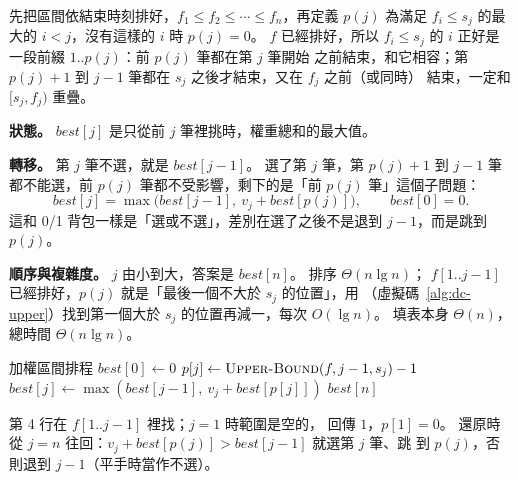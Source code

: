 先把區間依結束時刻排好，$f_1 \le f_2 \le \cdots \le f_n$，再定義 $p(j)$ 為滿足 $f_i \le s_j$
的最大的 $i < j$，沒有這樣的 $i$ 時 $p(j) = 0$。 $f$ 已經排好，所以 $f_i \le s_j$ 的 $i$ 正好是一段前綴 $1..p(j)$：前 $p(j)$ 筆都在第 $j$ 筆開始
之前結束，和它相容；第 $p(j) + 1$ 到 $j - 1$ 筆都在 $s_j$ 之後才結束，又在 $f_j$ 之前（或同時）
結束，一定和 $[s_j, f_j)$ 重疊。

\textbf{狀態。} $\mathit{best}[j]$ 是只從前 $j$ 筆裡挑時，權重總和的最大值。

\textbf{轉移。} 第 $j$ 筆不選，就是 $\mathit{best}[j - 1]$。 選了第 $j$ 筆，第 $p(j) + 1$ 到
$j - 1$ 筆都不能選，前 $p(j)$ 筆都不受影響，剩下的是「前 $p(j)$ 筆」這個子問題：
\[
\mathit{best}[j] = \max\bigl(\mathit{best}[j - 1],\ v_j + \mathit{best}[p(j)]\bigr), \qquad
\mathit{best}[0] = 0 .
\]
這和 0/1 背包一樣是「選或不選」，差別在選了之後不是退到 $j - 1$，而是跳到 $p(j)$。

\textbf{順序與複雜度。} $j$ 由小到大，答案是 $\mathit{best}[n]$。 排序 $\Theta(n \lg n)$；
$f[1..j-1]$ 已經排好，$p(j)$ 就是「最後一個不大於 $s_j$ 的位置」，用
（虛擬碼~\ref{alg:dc-upper}）找到第一個大於 $s_j$ 的位置再減一，每次
$O(\lg n)$。 填表本身 $\Theta(n)$，總時間 $\Theta(n \lg n)$。

\begin{pseudo}[label=alg:dp-wis]{加權區間排程}
 
    \State $\mathit{best}[0] \gets 0$
        \State $p[j] \gets \Call{Upper-Bound}{f, j - 1, s_j} - 1$
        \State $\mathit{best}[j] \gets \max(\mathit{best}[j - 1],\ v_j + \mathit{best}[p[j]])$
    \EndFor
    \State \Return $\mathit{best}[n]$
\EndFunction
\end{pseudo}

第 4 行在 $f[1..j-1]$ 裡找；$j = 1$ 時範圍是空的， 回傳 $1$，$p[1] = 0$。
還原時從 $j = n$ 往回：$v_j + \mathit{best}[p(j)] > \mathit{best}[j - 1]$ 就選第 $j$ 筆、跳
到 $p(j)$，否則退到 $j - 1$（平手時當作不選）。

\begin{center}
\begin{minipage}{\linewidth}
\centering
{}
\label{fig:dp-wis}
\end{minipage}
\end{center}

